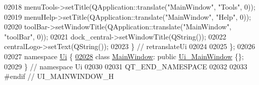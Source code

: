 \begin{DoxyCode}
02018         menuTools->setTitle(QApplication::translate(\textcolor{stringliteral}{"MainWindow"}, \textcolor{stringliteral}{"Tools"}, 0));
02019         menuHelp->setTitle(QApplication::translate(\textcolor{stringliteral}{"MainWindow"}, \textcolor{stringliteral}{"Help"}, 0));
02020         toolBar->setWindowTitle(QApplication::translate(\textcolor{stringliteral}{"MainWindow"}, \textcolor{stringliteral}{"toolBar"}, 0));
02021         dock\_central->setWindowTitle(QString());
02022         centralLogo->setText(QString());
02023     \} \textcolor{comment}{// retranslateUi}
02024 
02025 \};
02026 
02027 \textcolor{keyword}{namespace }\hyperlink{a00145}{Ui} \{
\hypertarget{a00139_source_l02028}{}\hyperlink{a00018}{02028}     \textcolor{keyword}{class }\hyperlink{a00018}{MainWindow}: \textcolor{keyword}{public} \hyperlink{a00080}{Ui\_MainWindow} \{\};
02029 \} \textcolor{comment}{// namespace Ui}
02030 
02031 QT\_END\_NAMESPACE
02032 
02033 \textcolor{preprocessor}{#endif // UI\_MAINWINDOW\_H}
\end{DoxyCode}
